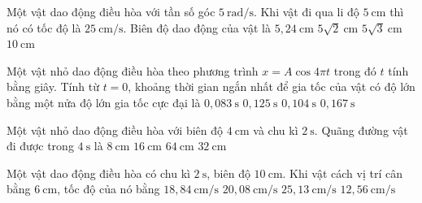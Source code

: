 \begin{ex}
Một vật dao động điều hòa với tần số góc $5\ \text{rad/s}$. Khi vật đi qua li độ $5\ \text{cm}$ thì nó có tốc độ là $25\ \text{cm/s}$. Biên độ dao động của vật là
\choice
{$5,24\ \text{cm}$}
{\True $5\sqrt{2}\ \text{cm}$}
{$5\sqrt{3}\ \text{cm}$}
{$10\ \text{cm}$}
\end{ex}

\begin{ex}
Một vật nhỏ dao động điều hòa theo phương trình
$x=A\cos 4\pi t$
trong đó $t$ tính bằng giây. Tính từ $t=0$, khoảng thời gian ngắn nhất để gia tốc của vật có độ lớn bằng một nửa độ lớn gia tốc cực đại là
\choice
{\True $0,083\ \text{s}$}
{$0,125\ \text{s}$}
{$0,104\ \text{s}$}
{$0,167\ \text{s}$}
\end{ex}

\begin{ex}
Một vật nhỏ dao động điều hòa với biên độ $4\ \text{cm}$ và chu kì $2\ \text{s}$. Quãng đường vật đi được trong $4\ \text{s}$ là
\choice
{$8\ \text{cm}$}
{$16\ \text{cm}$}
{$64\ \text{cm}$}
{\True $32\ \text{cm}$}
\end{ex}

\begin{ex}
Một vật dao động điều hòa có chu kì $2\ \text{s}$, biên độ $10\ \text{cm}$. Khi vật cách vị trí cân bằng $6\ \text{cm}$, tốc độ của nó bằng
\choice
{$18,84\ \text{cm/s}$}
{$20,08\ \text{cm/s}$}
{\True $25,13\ \text{cm/s}$}
{$12,56\ \text{cm/s}$}
\end{ex}

